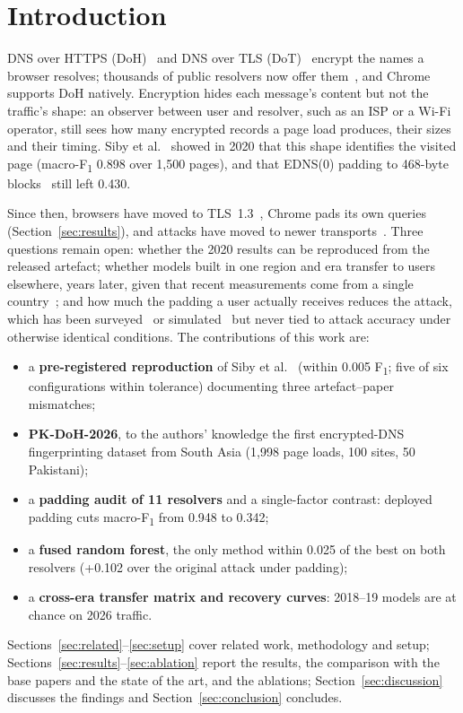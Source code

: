 \documentclass[pdflatex,sn-mathphys-num]{sn-jnl}
\newcommand{\Fone}{F\textsubscript{1}}
\begin{document}
\section{Introduction}\label{sec:intro}

DNS over HTTPS (DoH)~\cite{rfc8484} and DNS over TLS (DoT)~\cite{rfc7858} encrypt the names a browser resolves; thousands of public resolvers now offer them~\cite{bielefeld2026}, and Chrome supports DoH natively. Encryption hides each message's content but not the traffic's shape: an observer between user and resolver, such as an ISP or a Wi-Fi operator, still sees how many encrypted records a page load produces, their sizes and their timing. Siby et al.~\cite{siby2020} showed in 2020 that this shape identifies the visited page (macro-\Fone{} 0.898 over 1,500 pages), and that EDNS(0) padding to 468-byte blocks~\cite{rfc7830,rfc8467} still left 0.430.

Since then, browsers have moved to TLS~1.3~\cite{rfc8446}, Chrome pads its own queries (Section~\ref{sec:results}), and attacks have moved to newer transports~\cite{zhang2026dohfuse,salari2025odoh,mouregarrido2026,csikor2025,rfc9250}. Three questions remain open: whether the 2020 results can be reproduced from the released artefact; whether models built in one region and era transfer to users elsewhere, years later, given that recent measurements come from a single country~\cite{mouregarrido2026,salari2025odoh,csikor2025}; and how much the padding a user actually receives reduces the attack, which has been surveyed~\cite{li2025unraveling} or simulated~\cite{gong2026wfcat,jiang2026camouflage} but never tied to attack accuracy under otherwise identical conditions. The contributions of this work are:
\begin{itemize}
\item a \textbf{pre-registered reproduction} of Siby et al.~\cite{siby2020} (within 0.005 \Fone{}; five of six configurations within tolerance) documenting three artefact--paper mismatches;
\item \textbf{PK-DoH-2026}, to the authors' knowledge the first encrypted-DNS fingerprinting dataset from South Asia (1,998 page loads, 100 sites, 50 Pakistani);
\item a \textbf{padding audit of 11 resolvers} and a single-factor contrast: deployed padding cuts macro-\Fone{} from 0.948 to 0.342;
\item a \textbf{fused random forest}, the only method within 0.025 of the best on both resolvers (+0.102 over the original attack under padding);
\item a \textbf{cross-era transfer matrix and recovery curves}: 2018--19 models are at chance on 2026 traffic.
\end{itemize}
Sections~\ref{sec:related}--\ref{sec:setup} cover related work, methodology and setup; Sections~\ref{sec:results}--\ref{sec:ablation} report the results, the comparison with the base papers and the state of the art, and the ablations; Section~\ref{sec:discussion} discusses the findings and Section~\ref{sec:conclusion} concludes.
\end{document}
